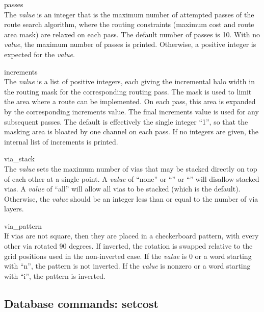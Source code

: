 \begin{description}
\item{\vt passes}\\
The {\it value} is an integer that is the maximum number of attempted
passes of the route search algorithm, where the routing constraints
(maximum cost and route area mask) are relaxed on each pass.  The
default number of passes is 10.  With no {\it value}, the maximum
number of passes is printed.  Otherwise, a positive integer is
expected for the {\it value}.

\item{\vt increments}\\
The {\it value} is a list of positive integers, each giving the
incremental halo width in the routing mask for the corresponding
routing pass.  The mask is used to limit the area where a route can
be implemented.  On each pass, this area is expanded by the
corresponding {\vt increments} value.  The final increments value is
used for any subsequent passes.  The default is effectively the
single integer ``1'', so that the masking area is bloated by one
channel on each pass.  If no integers are given, the internal list of
increments is printed.

\item{\vt via\_stack}\\
The {\it value} sets the maximum number of vias that may be stacked
directly on top of each other at a single point.  A {\it value} of
``{\vt none}'' or ``{}'' or ``{}'' will disallow stacked
vias.  A {\it value} of ``{\vt all}'' will allow all vias to be
stacked (which is the default).  Otherwise, the {\it value} should be
an integer less than or equal to the number of via layers.

\item{\vt via\_pattern}\\
If vias are not square, then they are placed in a checkerboard
pattern, with every other via rotated 90 degrees.  If inverted, the
rotation is swapped relative to the grid positions used in the
non-inverted case.  If the {\it value} is 0 or a word starting with
``{\vt n}'', the pattern is not inverted.  If the {\it value} is
nonzero or a word starting with ``{\vt i}'', the pattern is inverted.
\end{description}

\subsection{Database commands: {\vt setcost}}

